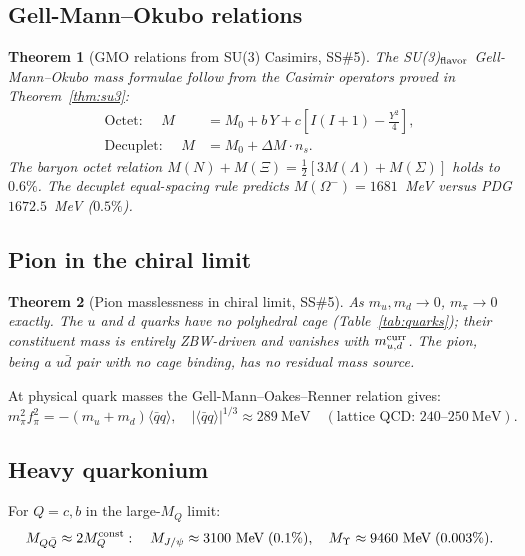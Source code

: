 \documentclass[11pt,a4paper]{article}
\newtheorem{theorem}{Theorem}[section]
\newcommand{\qqbar}{\langle\bar{q}q\rangle}
\begin{document}
\subsection{Gell-Mann--Okubo relations}

\begin{theorem}[GMO relations from SU(3) Casimirs, SS\#5]
\label{thm:gmo}
The SU(3)$_{\rm flavor}$ Gell-Mann--Okubo mass formulae follow from
the Casimir operators proved in Theorem~\ref{thm:su3}:
\begin{align}
\text{Octet: }\quad
M &= M_0 + b\,Y + c\left[I(I+1) - \tfrac{Y^2}{4}\right],
\label{eq:gmo_o} \\
\text{Decuplet: }\quad
M &= M_0 + \Delta M\cdot n_s.
\label{eq:gmo_d}
\end{align}
The baryon octet relation $M(N)+M(\Xi) = \frac{1}{2}[3M(\Lambda)+M(\Sigma)]$
holds to $0.6\%$.  The decuplet equal-spacing rule predicts
$M(\Omega^-) = 1681$~MeV versus PDG $1672.5$~MeV ($0.5\%$).
\end{theorem}

\subsection{Pion in the chiral limit}

\begin{theorem}[Pion masslessness in chiral limit, SS\#5]
\label{thm:pion}
As $m_u, m_d \to 0$, $m_\pi \to 0$ exactly.  The $u$ and $d$
quarks have no polyhedral cage (Table~\ref{tab:quarks}); their
constituent mass is entirely ZBW-driven and vanishes with
$m_{u,d}^{\rm curr}$.  The pion, being a $u\bar{d}$ pair with
no cage binding, has no residual mass source.
\end{theorem}

At physical quark masses the Gell-Mann--Oakes--Renner relation gives:
\begin{equation}
m_\pi^2 f_\pi^2 = -(m_u+m_d)\qqbar,\quad
|\qqbar|^{1/3} \approx 289\ \text{MeV}
\quad(\text{lattice QCD: }240\text{--}250\ \text{MeV}).
\label{eq:gor}
\end{equation}

\subsection{Heavy quarkonium}

For $Q = c, b$ in the large-$M_Q$ limit:
\begin{equation}
M_{Q\bar{Q}} \approx 2M_Q^{\rm const}:
\quad M_{J/\psi} \approx 3100\ \text{MeV}\; (0.1\%),\quad
M_{\Upsilon} \approx 9460\ \text{MeV}\; (0.003\%).
\label{eq:quarkonium}
\end{equation}
\end{document}
